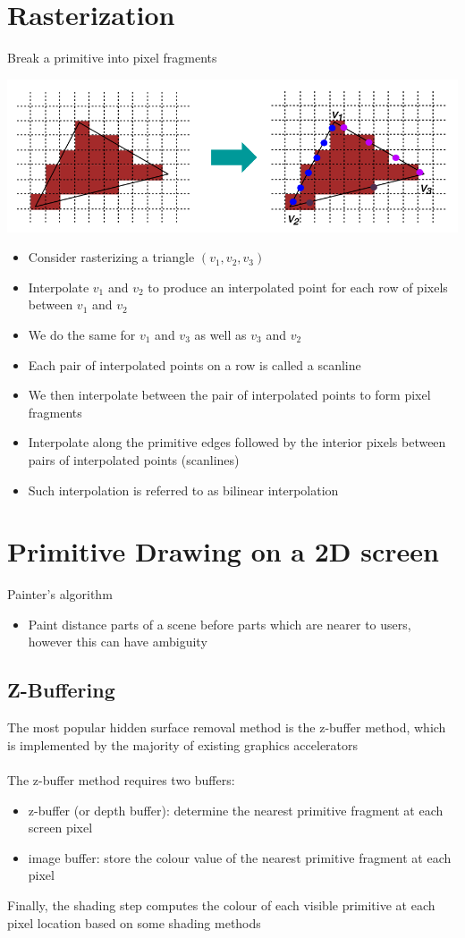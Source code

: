 \documentclass{article}[18pt]
\begin{document}
\section{Rasterization}
Break a primitive into pixel fragments
\begin{center}
	\includegraphics[scale=0.7]{Rasterization}
\end{center}
\begin{itemize}
	\item Consider rasterizing a triangle $(v_1,v_2,v_3)$
	\item Interpolate $v_1$ and $v_2$ to produce an interpolated point for each row of pixels between $v_1$ and $v_2$
	\item We do the same for $v_1$ and $v_3$ as well as $v_3$ and $v_2$
	\item Each pair of interpolated points on a row is called a scanline
	\item We then interpolate between the pair of interpolated points to form pixel fragments
	\item Interpolate along the primitive edges followed by the interior pixels between pairs of interpolated points (scanlines)
	\item Such interpolation is referred to as bilinear interpolation
\end{itemize}
\section{Primitive Drawing on a 2D screen}
Painter's algorithm
\begin{itemize}
	\item Paint distance parts of a scene before parts which are nearer to users, however this can have ambiguity
\end{itemize}
\subsection{Z-Buffering}
The most popular hidden surface removal method is the z-buffer method, which is implemented by the majority of existing graphics accelerators\\
\\
The z-buffer method requires two buffers:
\begin{itemize}
	\item z-buffer (or depth buffer): determine the nearest primitive fragment at each screen pixel
	\item image buffer: store the colour value of the nearest primitive fragment at each pixel
\end{itemize}
Finally, the shading step computes the colour of each visible primitive at each pixel location based on some shading methods
\end{document}
